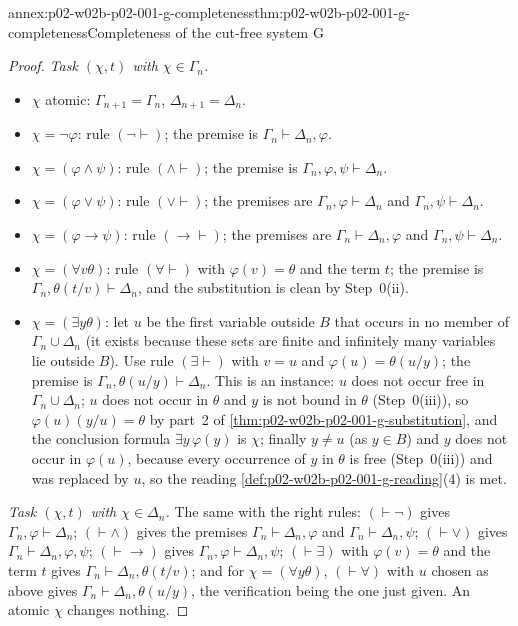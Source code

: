 \begin{annexitem}{annex:p02-w02b-p02-001-g-completeness}{thm:p02-w02b-p02-001-g-completeness}{Completeness of the cut-free system G}
\begin{proof}
\emph{Task \((\chi,t)\) with \(\chi\in\Gamma_n\).}
\begin{itemize}
\item \(\chi\) atomic: \(\Gamma_{n+1}=\Gamma_n\), \(\Delta_{n+1}=\Delta_n\).
\item \(\chi=\neg\varphi\): rule \((\neg\vdash)\); the premise is
      \(\Gamma_n\vdash\Delta_n,\varphi\).
\item \(\chi=(\varphi\land\psi)\): rule \((\land\vdash)\); the premise is
      \(\Gamma_n,\varphi,\psi\vdash\Delta_n\).
\item \(\chi=(\varphi\lor\psi)\): rule \((\lor\vdash)\); the premises are
      \(\Gamma_n,\varphi\vdash\Delta_n\) and \(\Gamma_n,\psi\vdash\Delta_n\).
\item \(\chi=(\varphi\to\psi)\): rule \((\to\vdash)\); the premises are
      \(\Gamma_n\vdash\Delta_n,\varphi\) and \(\Gamma_n,\psi\vdash\Delta_n\).
\item \(\chi=(\forall v\theta)\): rule \((\forall\vdash)\) with
      \(\varphi(v)=\theta\) and the term \(t\); the premise is
      \(\Gamma_n,\theta(t/v)\vdash\Delta_n\), and the substitution is clean
      by Step~0(ii).
\item \(\chi=(\exists y\theta)\): let \(u\) be the first variable outside
      \(B\) that occurs in no member of \(\Gamma_n\cup\Delta_n\) (it exists
      because these sets are finite and infinitely many variables lie
      outside \(B\)).  Use rule \((\exists\vdash)\) with \(v=u\) and
      \(\varphi(u)=\theta(u/y)\); the premise is
      \(\Gamma_n,\theta(u/y)\vdash\Delta_n\).  This is an instance: \(u\)
      does not occur free in \(\Gamma_n\cup\Delta_n\); \(u\) does not occur
      in \(\theta\) and \(y\) is not bound in \(\theta\) (Step~0(iii)), so
      \(\varphi(u)(y/u)=\theta\) by part~2 of
      \cref{thm:p02-w02b-p02-001-g-substitution}, and the conclusion
      formula \(\exists y\,\varphi(y)\) is \(\chi\); finally \(y\neq u\)
      (as \(y\in B\)) and \(y\) does not occur in \(\varphi(u)\), because
      every occurrence of \(y\) in \(\theta\) is free (Step~0(iii)) and was
      replaced by \(u\), so the reading
      \cref{def:p02-w02b-p02-001-g-reading}(4) is met.
\end{itemize}

\emph{Task \((\chi,t)\) with \(\chi\in\Delta_n\).}  The same with the right
rules: \((\vdash\neg)\) gives \(\Gamma_n,\varphi\vdash\Delta_n\);
\((\vdash\land)\) gives the premises \(\Gamma_n\vdash\Delta_n,\varphi\) and
\(\Gamma_n\vdash\Delta_n,\psi\); \((\vdash\lor)\) gives
\(\Gamma_n\vdash\Delta_n,\varphi,\psi\); \((\vdash\to)\) gives
\(\Gamma_n,\varphi\vdash\Delta_n,\psi\); \((\vdash\exists)\) with
\(\varphi(v)=\theta\) and the term \(t\) gives
\(\Gamma_n\vdash\Delta_n,\theta(t/v)\); and for \(\chi=(\forall y\theta)\),
\((\vdash\forall)\) with \(u\) chosen as above gives
\(\Gamma_n\vdash\Delta_n,\theta(u/y)\), the verification being the one
just given.  An atomic \(\chi\) changes nothing.


\end{proof}
\end{annexitem}
